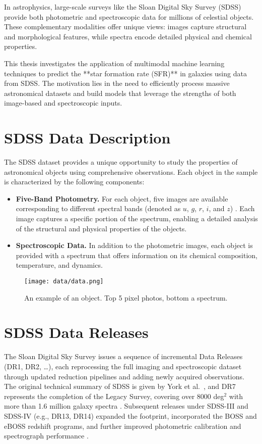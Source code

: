 \documentclass[english,bachelor,oneside]{ctufit-thesis}
\begin{document}
In astrophysics, large-scale surveys like the Sloan Digital Sky Survey (SDSS) \cite{york2000sloan} provide both photometric and spectroscopic data for millions of celestial objects. These complementary modalities offer unique views: images capture structural and morphological features, while spectra encode detailed physical and chemical properties.

This thesis investigates the application of multimodal machine learning techniques to predict the **star formation rate (SFR)** \cite{lopes2021effects} in galaxies using data from SDSS. The motivation lies in the need to efficiently process massive astronomical datasets and build models that leverage the strengths of both image-based and spectroscopic inputs.

\section{SDSS Data Description}

The SDSS dataset provides a unique opportunity to study the properties of astronomical objects using comprehensive observations. Each object in the sample is characterized by the following components:
\begin{itemize}
    \item \textbf{Five-Band Photometry.} For each object, five images are available corresponding to different spectral bands (denoted as \(u\), \(g\), \(r\), \(i\), and \(z\)) \cite{fukugita1996sloan}. Each image captures a specific portion of the spectrum, enabling a detailed analysis of the structural and physical properties of the objects.
    \item \textbf{Spectroscopic Data.} In addition to the photometric images, each object is provided with a spectrum that offers information on its chemical composition, temperature, and dynamics.
\end{itemize}

\begin{figure}[h]
    \centering
    \texttt{[image: data/data.png]}
    \caption{An example of an object. Top 5 pixel photos, bottom a spectrum.}
    \label{fig:prism}
\end{figure}

\section{SDSS Data Releases} 
The Sloan Digital Sky Survey issues a sequence of incremental Data Releases (DR1, DR2, \dots), each reprocessing the full imaging and spectroscopic dataset through updated reduction pipelines and adding newly acquired observations. The original technical summary of SDSS is given by York et al.\ \cite{york2000sloan}, and DR7 represents the completion of the Legacy Survey, covering over 8000 deg$^2$ with more than 1.6 million galaxy spectra \cite{Abazajian2009}. Subsequent releases under SDSS-III and SDSS-IV (e.g., DR13, DR14) expanded the footprint, incorporated the BOSS and eBOSS redshift programs, and further improved photometric calibration and spectrograph performance \cite{Albareti2017}.
\end{document}
